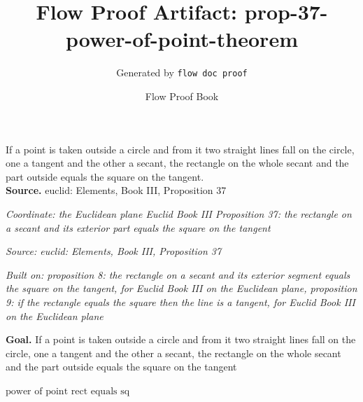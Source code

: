 \documentclass[11pt]{article}
\title{Flow Proof Artifact: prop-37-power-of-point-theorem}
\author{Generated by \texttt{flow doc proof}}
\date{Flow Proof Book}
\theoremstyle{definition}
\begin{document}
\maketitle
If a point is taken outside a circle and from it two straight lines fall on the circle, one a tangent and the other a secant, the rectangle on the whole secant and the part outside equals the square on the tangent.\\[0.5em]
\textbf{Source.} euclid: Elements, Book III, Proposition 37\\[0.5em]
\bigskip
{}\par
\smallskip\noindent\textit{Coordinate: the Euclidean plane \cdot Euclid Book III \cdot Proposition 37: the rectangle on a secant and its exterior part equals the square on the tangent}\par
\smallskip\noindent\textit{Source: euclid: Elements, Book III, Proposition 37}\par
\smallskip\noindent\textit{Built on: proposition 8: the rectangle on a secant and its exterior segment equals the square on the tangent, for Euclid Book III on the Euclidean plane, proposition 9: if the rectangle equals the square then the line is a tangent, for Euclid Book III on the Euclidean plane}\par
\medskip
\noindent\textbf{Goal.} If a point is taken outside a circle and from it two straight lines fall on the circle, one a tangent and the other a secant, the rectangle on the whole secant and the part outside equals the square on the tangent\par
\noindent$\displaystyle \text{power of point rect equals sq}$\par
\medskip
\noindent
\end{document}
